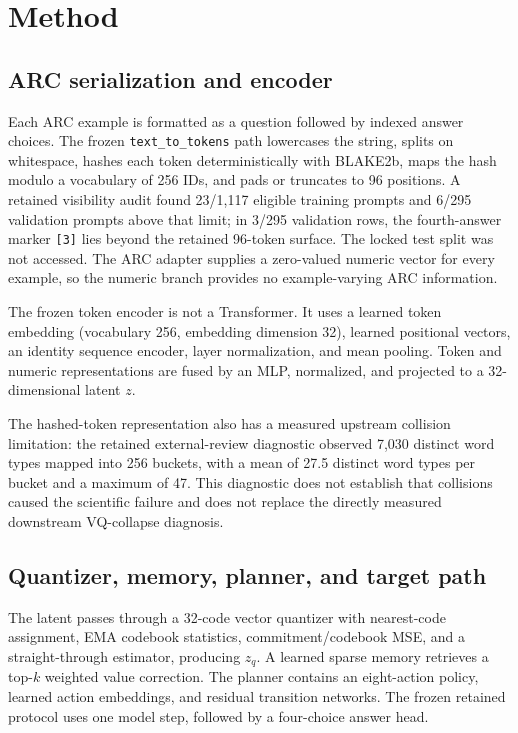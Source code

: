 \documentclass[twoside]{article}
\begin{document}
\section{Method}
\subsection{ARC serialization and encoder}
Each ARC example is formatted as a question followed by indexed answer choices. The frozen \texttt{text\_to\_tokens} path lowercases the string, splits on whitespace, hashes each token deterministically with BLAKE2b, maps the hash modulo a vocabulary of 256 IDs, and pads or truncates to 96 positions. A retained visibility audit found 23/1,117 eligible training prompts and 6/295 validation prompts above that limit; in 3/295 validation rows, the fourth-answer marker \texttt{[3]} lies beyond the retained 96-token surface. The locked test split was not accessed. The ARC adapter supplies a zero-valued numeric vector for every example, so the numeric branch provides no example-varying ARC information.

The frozen token encoder is not a Transformer. It uses a learned token embedding (vocabulary 256, embedding dimension 32), learned positional vectors, an identity sequence encoder, layer normalization, and mean pooling. Token and numeric representations are fused by an MLP, normalized, and projected to a 32-dimensional latent $z$.

The hashed-token representation also has a measured upstream collision limitation: the retained external-review diagnostic observed 7,030 distinct word types mapped into 256 buckets, with a mean of 27.5 distinct word types per bucket and a maximum of 47. This diagnostic does not establish that collisions caused the scientific failure and does not replace the directly measured downstream VQ-collapse diagnosis.

\subsection{Quantizer, memory, planner, and target path}
The latent passes through a 32-code vector quantizer with nearest-code assignment, EMA codebook statistics, commitment/codebook MSE, and a straight-through estimator, producing $z_q$. A learned sparse memory retrieves a top-$k$ weighted value correction. The planner contains an eight-action policy, learned action embeddings, and residual transition networks. The frozen retained protocol uses one model step, followed by a four-choice answer head.
\end{document}
